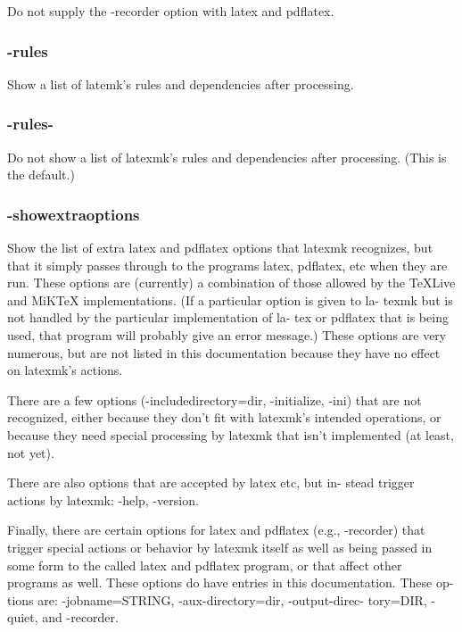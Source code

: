 Do not supply the -recorder option with latex and pdflatex.

\subsubsection{-rules}

Show a list of latemk's rules and dependencies after processing.

\subsubsection{-rules-}

Do  not  show  a  list of latexmk's rules and dependencies after
processing.  (This is the default.)


\subsubsection{-showextraoptions}

Show the list of extra latex and pdflatex options  that  latexmk
recognizes,  but  that  it simply passes through to the programs
latex, pdflatex, etc  when they  are  run.   These  options  are
(currently)  a  combination  of those allowed by the TeXLive and
MiKTeX implementations.  (If a particular option is given to la-
texmk but is not handled by the particular implementation of la-
tex or pdflatex that is being used, that program  will  probably
give  an  error  message.)  These options are very numerous, but
are not listed in this documentation because they have no effect
on latexmk's actions.

There  are  a  few  options (-includedirectory=dir, -initialize,
-ini) that are not recognized, either  because  they  don't  fit
with latexmk's intended operations, or because they need special
processing by latexmk that  isn't  implemented  (at  least,  not
yet).

There  are  also options that are accepted by latex etc, but in-
stead trigger actions by latexmk: -help, -version.

Finally, there are certain options for latex and pdflatex (e.g.,
-recorder)  that  trigger special actions or behavior by latexmk
itself as well as being passed in some form to the called  latex
and  pdflatex  program,  or  that affect other programs as well.
These options do have entries in this documentation.  These  op-
tions  are:  -jobname=STRING, -aux-directory=dir, -output-direc-
tory=DIR, -quiet, and -recorder.


